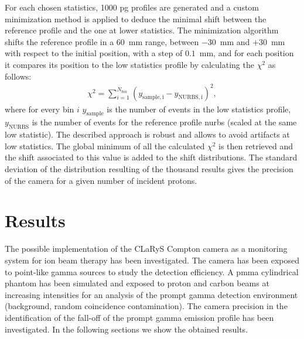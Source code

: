 For each chosen statistics, 1000 \gls{pg} profiles are generated and a custom minimization method is applied to deduce the minimal shift between the reference profile and the one at lower statistics. The minimization algorithm shifts the reference profile in a 60~mm range, between $-30$~mm and $+30$~mm with respect to the initial position, with a step of $0.1$~mm, and for each position it compares its position to the low statistics profile by calculating the $\chi^2$ as follows:
\begin{eqnarray}
\chi^2 = \sum\limits_{i=1}^{N_{bin}} {(y_{\mathrm{sample,i}}-y_{\mathrm{NURBS,i}})^2},
\end{eqnarray}
where for every bin $i$ $y_{\mathrm{sample}}$ is the number of events in the low statistics profile, $y_{\mathrm{NURBS}}$ is the number of events for the reference profile \gls{nurbs} (scaled at the same low statistic). 
The described approach is robust and allows to avoid artifacts at low statistics.
The global minimum of all the calculated $\chi^2$ is then retrieved and the shift associated to this value is added to the shift distributions. 
The standard deviation of the distribution resulting of the thousand results gives the precision of the camera for a given number of incident protons. 

\section{Results}\label{chap4::sec::results}

The possible implementation of the CLaRyS Compton camera as a monitoring system for ion beam therapy has been investigated. The camera has been exposed to point-like gamma sources to study the detection efficiency.
A \gls{pmma} cylindrical phantom has been simulated and exposed to proton and carbon beams at increasing intensities for an analysis of the prompt gamma detection environment (background, random coincidence contamination). The camera precision in the identification of the fall-off of the prompt gamma emission profile has been investigated.
In the following sections we show the obtained results.  


